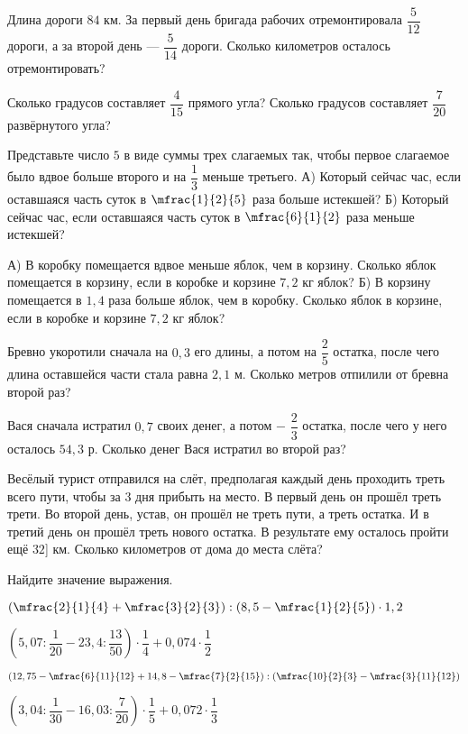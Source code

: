 \begin{class}[number=6]
	\begin{listofex}
		\item Длина дороги \(84\) км. За первый день бригада рабочих отремонтировала \(\dfrac{5}{12}\) дороги, а за второй день --- \(\dfrac{5}{14}\) дороги. Сколько километров осталось отремонтировать?
		\item Сколько градусов составляет \(\dfrac{4}{15}\) прямого угла? Сколько градусов составляет \(\dfrac{7}{20}\) развёрнутого угла?
		\item Представьте число \(5\) в виде суммы трех слагаемых так, чтобы первое слагаемое было вдвое больше второго и на \(\dfrac{1}{3}\) меньше третьего.
		А) Который сейчас час, если оставшаяся часть суток в \(\mfrac{1}{2}{5}\) раза больше истекшей? Б) Который сейчас час, если оставшаяся часть суток в \(\mfrac{6}{1}{2}\) раза меньше истекшей?
		\item А) В коробку помещается вдвое меньше яблок, чем в корзину. Сколько яблок помещается в корзину, если в коробке и корзине \(7,2\) кг яблок? Б) В корзину помещается в \(1,4\) раза больше яблок, чем в коробку. Сколько яблок в корзине, если в коробке и корзине \( 7,2\) кг яблок?
		\item Бревно укоротили сначала на \(0,3\) его длины, а потом на \(\dfrac{2}{5}\)  остатка, после чего длина оставшейся части стала равна \(2,1\) м. Сколько метров отпилили от бревна второй раз?
		\item Вася сначала истратил \(0,7\) своих денег, а потом − \(\dfrac{2}{3}\) остатка, после чего у него осталось \(54,3\) р. Сколько денег Вася истратил во второй раз?
		\item Весёлый турист отправился на слёт, предполагая каждый день проходить треть всего пути, чтобы за \(3\) дня прибыть на место. В первый день он прошёл треть трети. Во второй день, устав, он прошёл не треть пути, а треть остатка. И в третий день он прошёл треть нового остатка. В результате ему осталось пройти ещё \(32\)] км. Сколько километров от дома до места слёта?
		\item Найдите значение выражения.
		\begin{enumcols}[itemcolumns=2]
			\item \(\left(\mfrac{2}{1}{4}+\mfrac{3}{2}{3}\right):\left(8,5-\mfrac{1}{2}{5}\right) \cdot 1,2\)
			\item \(\left(5,07:\dfrac{1}{20}-23,4: \dfrac{13}{50}\right) \cdot \dfrac{1}{4} + 0,074 \cdot \dfrac{1}{2}\)
			\item \( \left( 12,75 - \mfrac{6}{11}{12} + 14,8 - \mfrac{7}{2}{15}\right): \left( \mfrac{10}{2}{3} - \mfrac{3}{11}{12} \right) \)
			\item \(\left(3,04:\dfrac{1}{30}-16,03: \dfrac{7}{20}\right) \cdot \dfrac{1}{5} + 0,072 \cdot \dfrac{1}{3}\)
		\end{enumcols}
	\end{listofex}
\end{class}
%
%
%
%	
